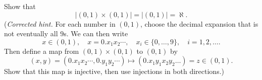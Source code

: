 \begin{exercise}
  \label{ex:hw01:square-cardinality}
  Show that
  \[
    |(0,1)\times(0,1)|=|(0,1)|=\aleph.
  \]
  (\textit{Corrected hint.} For each number in $(0,1)$, choose the decimal
  expansion that is not eventually all $9$s. We can then write
  \[
    x\in(0,1),\quad x=0.x_1x_2\cdots,\quad
    x_i\in\{0,\ldots,9\},\quad i=1,2,\ldots.
  \]
  Then define a map from $(0,1)\times(0,1)$ to $(0,1)$ by
  \[
    (x,y)=(0.x_1x_2\cdots,0.y_1y_2\cdots)
    \mapsto (0.x_1y_1x_2y_2\ldots)=z\in(0,1).
  \]
  Show that this map is injective, then use injections in both directions.)
\end{exercise}
